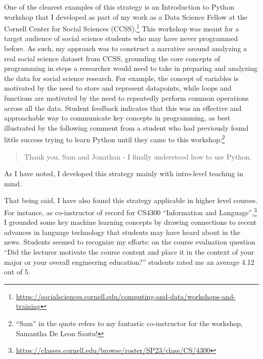 \documentclass[12pt,letterpaper]{article}
\begin{document}
One of the clearest examples of this strategy is an Introduction to Python workshop that I developed as part of my work as a Data Science Fellow at the Cornell Center for Social Sciences (CCSS).\footnote{\url{https://socialsciences.cornell.edu/computing-and-data/workshops-and-training}}
This workshop was meant for a target audience of social science students who may have never programmed before.
As such, my approach was to construct a narrative around analyzing a real social science dataset from CCSS, grounding the core concepts of programming in steps a researcher would need to take in preparing and analyzing the data for social science research.
For example, the concept of variables is motivated by the need to store and represent datapoints, while loops and functions are motivated by the need to repeatedly perform common operations across all the data.
Student feedback indicates that this was an effective and approachable way to communicate key concepts in programming, as best illustrated by the following comment from a student who had previously found little success trying to learn Python until they came to this workshop:\footnote{``Sam'' in the quote refers to my fantastic co-instructor for the workshop, Samantha De Leon Sautu!}
\begin{quote}
    Thank you, Sam and Jonathan - I finally understood how to use Python.
\end{quote}

As I have noted, I developed this strategy mainly with intro-level teaching in mind.
\narrativeendsent

That being said, I have also found this strategy applicable in higher level courses.
For instance, as co-instructor of record for CS4300 ``Information and Language'',\footnote{\url{https://classes.cornell.edu/browse/roster/SP23/class/CS/4300}} I grounded some key machine learning concepts by drawing connections to recent advances in language technology that students may have heard about in the news.
Students seemed to recognize my efforts: on the course evaluation question ``Did the lecturer motivate the course content
and place it in the context of your major or your overall engineering
education?'' students rated me an average 4.12 out of 5.
\end{document}
